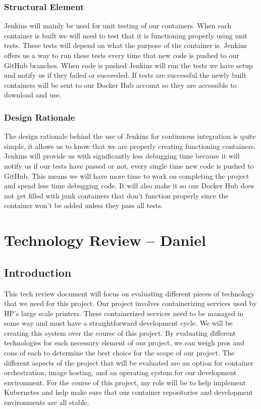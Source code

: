 \documentclass[onecolumn, draftclsnofoot,10pt, compsoc]{IEEEtran}
\begin{document}
\subsubsection{Structural Element}
Jenkins will mainly be used for unit testing of our containers. When each container is built we will need to test that it is functioning properly using unit tests. These tests will depend on what the purpose of the container is. Jenkins offers us a way to run these tests every time that new code is pushed to our GitHub branches. When code is pushed Jenkins will run the tests we have setup and notify us if they failed or succeeded. If tests are successful the newly built containers will be sent to our Docker Hub account so they are accessible to download and use.
\subsubsection{Design Rationale}
The design rationale behind the use of Jenkins for continuous integration is quite simple, it allows us to know that we are properly creating functioning containers. Jenkins will provide us with significantly less debugging time because it will notify us if our tests have passed or not, every single time new code is pushed to GitHub. This means we will have more time to work on completing the project and spend less time debugging code. It will also make it so our Docker Hub does not get filled with junk containers that don't function properly since the container won't be added unless they pass all tests.



\section{Technology Review -- Daniel}

\subsection{Introduction}

This tech review document will focus on evaluating different pieces of technology that we need for this project. Our project involves containerizing services used by HP's large scale printers. These containerized services need to be managed in some way and must have a straightforward development cycle. We will be creating this system over the course of this project. By evaluating different technologies for each necessary element of our project, we can weigh pros and cons of each to determine the best choice for the scope of our project. The different aspects of the project that will be evaluated are an option for container orchestration, image hosting, and an operating system for our development environment. For the course of this project, my role will be to help implement Kubernetes and help make sure that our container repositories and development environments are all stable.
\end{document}
